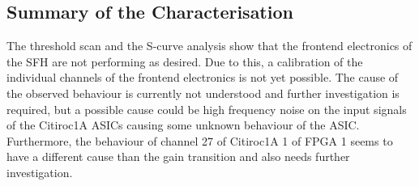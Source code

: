\subsection{Summary of the Characterisation}
The threshold scan and the S-curve analysis show that the frontend electronics of the SFH are not performing as desired.
Due to this, a calibration of the individual channels of the frontend electronics is not yet possible.
The cause of the observed behaviour is currently not understood and further investigation is required,
but a possible cause could be high frequency noise on the input signals of the Citiroc1A ASICs causing some unknown behaviour of the ASIC.
Furthermore, the behaviour of channel 27 of Citiroc1A 1 of FPGA 1 seems to have a different cause than the gain transition and also needs further investigation.


